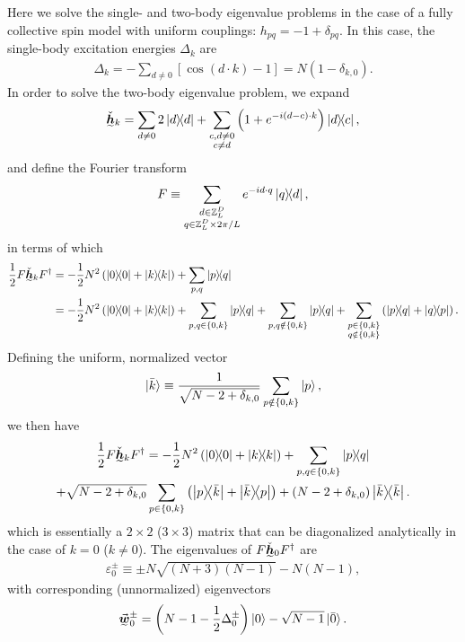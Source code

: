 \documentclass[nofootinbib,notitlepage,11pt]{revtex4-2}
\newcommand{\f}[2]{\dfrac{#1}{#2}} %
\newcommand{\p}[1]{\left(#1\right)} %
\renewcommand{\sp}[1]{\left[#1\right]} %
\renewcommand{\set}[1]{\left\{#1\right\}} %
\renewcommand{\c}{\cdot} %
\newcommand{\m}{\bm} %
\renewcommand{\v}{\vec} %
\newcommand{\1}{\mathds{1}}
\newcommand{\ZZ}{\mathbb{Z}}
\newcommand{\ut}{\undertilde}
\begin{document}
Here we solve the single- and two-body eigenvalue problems in the case
of a fully collective spin model with uniform couplings:
$h_{pq}=-1+\delta_{pq}$.  In this case, the single-body excitation
energies $\Delta_k$ are
\begin{align}
  \Delta_k
  = - \sum_{d\ne 0} \sp{\cos\p{d\c k}-1}
  = N \p{1-\delta_{k,0}}.
\end{align}
In order to solve the two-body eigenvalue problem, we expand
\begin{align}
  \ut{\check{\m h}}_k
  = \sum_{d\ne0} 2 \op{d}
  + \sum_{\substack{c,d\ne0\\c\ne d}} \p{1+e^{-i\p{d-c}\c k}} \op{d}{c},
\end{align}
and define the Fourier transform
\begin{align}
  F \equiv \sum_{\substack{d\in\ZZ_L^D\\q\in\ZZ_L^D\times2\pi/L}}
  e^{-id\c q} \op{q}{d},
\end{align}
in terms of which
\begin{align}
  \f12 F \ut{\check{\m h}}_k F^\dag
  &= - \f12 N^2 \p{\op{0} + \op{k}} + \sum_{p,q} \op{p}{q} \\
  &= - \f12 N^2 \p{\op{0} + \op{k}} + \sum_{p,q\in\set{0,k}} \op{p}{q}
  + \sum_{p,q\notin\set{0,k}} \op{p}{q}
  + \sum_{\substack{p\in\set{0,k}\\q\notin\set{0,k}}}
  \p{\op{p}{q} + \op{q}{p}}.
\end{align}
Defining the uniform, normalized vector
\begin{align}
  \ket{\bar{k}} \equiv \f1{\sqrt{N-2+\delta_{k,0}}}
  \sum_{p\notin\set{0,k}} \ket{p},
\end{align}
we then have
\begin{multline}
  \f12 F \ut{\check{\m h}}_k F^\dag
  = - \f12 N^2 \p{\op{0} + \op{k}}
  + \sum_{p,q\in\set{0,k}} \op{p}{q} \\
  + \sqrt{N-2+\delta_{k,0}} \sum_{p\in\set{0,k}}
  \p{\op{p}{\bar{k}} + \op{\bar{k}}{p}}
  + \p{N-2+\delta_{k,0}} \op{\bar{k}}.
\end{multline}
which is essentially a $2\times 2$ ($3\times 3$) matrix that can be
diagonalized analytically in the case of $k=0$ ($k\ne0$).  The
eigenvalues of $F \ut{\check{\m h}}_0 F^\dag$ are
\begin{align}
  \varepsilon_0^\pm \equiv \pm N\sqrt{\p{N+3}\p{N-1}} - N\p{N-1},
\end{align}
with corresponding (unnormalized) eigenvectors
\begin{align}
  \ut{\v{\m w}}_0^\pm
  = \p{N - 1 - \f12 \Delta_0^\pm} \ket{0} - \sqrt{N-1} \ket{\bar{0}}.
\end{align}
\end{document}
